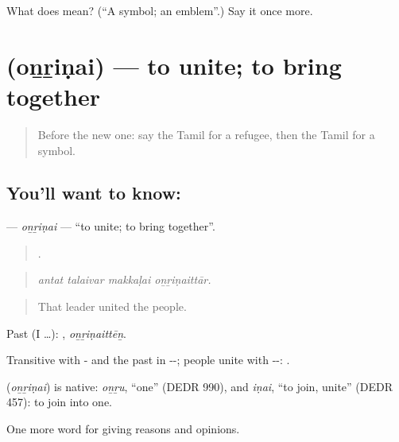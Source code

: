 \begin{tcolorbox}[breakable,colback=teal!4,colframe=teal!35!black,title={Before you move on}]
What does  mean? (\textquotedblleft{}A symbol; an emblem\textquotedblright{}.) Say it once more.
\end{tcolorbox}
\section[\texorpdfstring{\ta{ஒன்றிணை} (oṉṟiṇai)}{ஒன்றிணை (oṉṟiṇai)}]{ (oṉṟiṇai) — to unite; to bring together}

\label{lesson:TA-C381-onrinai}



\begin{quote}
Before the new one: say the Tamil for a refugee, then the Tamil for a symbol.
\end{quote}

\subsection*{You'll want to know: }
\textbf{} — \emph{oṉṟiṇai} — \textquotedblleft{}to unite; to bring together\textquotedblright{}.

\begin{quote}
   .
\end{quote}

\begin{quote}
\emph{antat talaivar makkaḷai oṉṟiṇaittār.}
\end{quote}

\begin{quote}
That leader united the people.
\end{quote}

Past (I …): , \emph{oṉṟiṇaittēṉ}.

Transitive with - and the past in --; people unite with --: .

\begin{cousinweb}
\textbf{} (\emph{oṉṟiṇai}) is native: \emph{oṉṟu}, \textquotedblleft{}one\textquotedblright{} (DEDR 990), and \emph{iṇai}, \textquotedblleft{}to join, unite\textquotedblright{} (DEDR 457): to join into one.
\end{cousinweb}

\begin{grammarlens}[title={What you've built}]
One more word for giving reasons and opinions.
\end{grammarlens}

